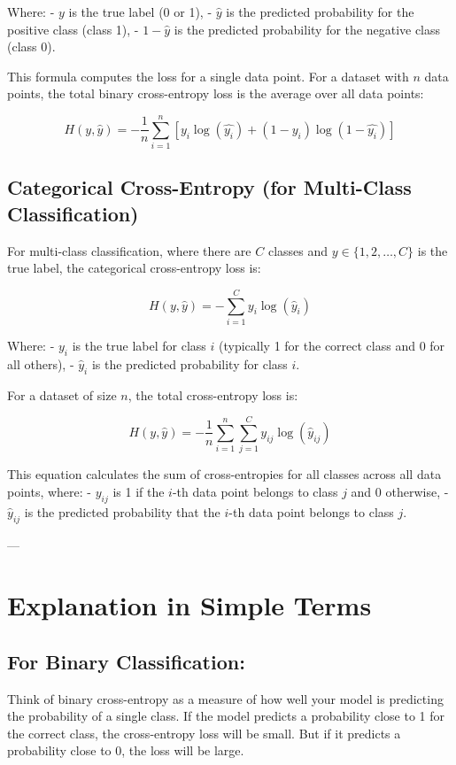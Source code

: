 \documentclass[12pt]{book}
\begin{document}
Where:
- \( y \) is the true label (0 or 1),
- \( \hat{y} \) is the predicted probability for the positive class (class 1),
- \( 1 - \hat{y} \) is the predicted probability for the negative class (class 0).

This formula computes the loss for a single data point. For a dataset with \( n \) data points, the total binary cross-entropy loss is the average over all data points:

\[
H(y, \hat{y}) = -\frac{1}{n} \sum_{i=1}^{n} [y_i \log(\hat{y_i}) + (1 - y_i) \log(1 - \hat{y_i})]
\]

\subsection{Categorical Cross-Entropy (for Multi-Class Classification)}

For multi-class classification, where there are \( C \) classes and \( y \in \{1, 2, \dots, C\} \) is the true label, the categorical cross-entropy loss is:

$$
H(y, \hat{y}) = - \sum_{i=1}^{C} y_i \log(\hat{y}_i)
$$

Where:
- \( y_i \) is the true label for class \( i \) (typically 1 for the correct class and 0 for all others),
- \( \hat{y}_i \) is the predicted probability for class \( i \).

For a dataset of size \( n \), the total cross-entropy loss is:

$$
H(y, \hat{y}) = -\frac{1}{n} \sum_{i=1}^{n} \sum_{j=1}^{C} y_{ij} \log(\hat{y}_{ij})
$$

This equation calculates the sum of cross-entropies for all classes across all data points, where:
- \( y_{ij} \) is 1 if the \( i \)-th data point belongs to class \( j \) and 0 otherwise,
- \( \hat{y}_{ij} \) is the predicted probability that the \( i \)-th data point belongs to class \( j \).

---

\section{Explanation in Simple Terms}

\subsection{For Binary Classification:}
Think of binary cross-entropy as a measure of how well your model is predicting the probability of a single class. If the model predicts a probability close to 1 for the correct class, the cross-entropy loss will be small. But if it predicts a probability close to 0, the loss will be large.
\end{document}
